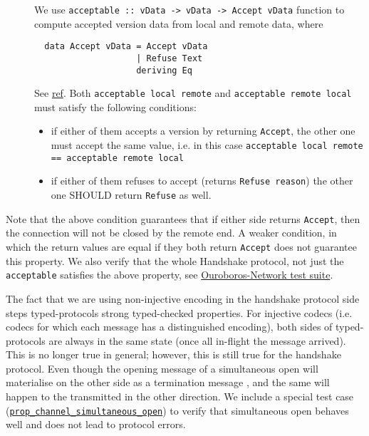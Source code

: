 \begin{description}
  \item[]
    We use \texttt{acceptable :: vData -> vData -> Accept vData}
    function to compute accepted version data from local and remote data,
    where
\begin{verbatim}
  data Accept vData = Accept vData
                    | Refuse Text
                    deriving Eq
\end{verbatim}
    See
    \href{https://ouroboros-network.cardano.intersectmbo.org/ouroboros-network-framework/Ouroboros-Network-Protocol-Handshake-Version.html#t:Acceptable}{ref}.
    Both \texttt{acceptable local remote} and \texttt{acceptable remote local}
    must satisfy the following conditions:
    \begin{itemize}
      \item if either of them accepts a version by returning \texttt{Accept},
        the other one must accept the same value, i.e. in this case
        \texttt{acceptable local remote == acceptable remote local}
      \item if either of them refuses to accept (returns \texttt{Refuse reason})
        the other one SHOULD return \texttt{Refuse} as well.
    \end{itemize}
\end{description}
Note that the above condition guarantees that if either side returns
\texttt{Accept}, then the connection will not be closed by the remote end.
A weaker condition, in which the return values are equal if they both return
\texttt{Accept} does not guarantee this property.  We also verify that the
whole Handshake protocol, not just the \texttt{acceptable} satisfies the above
property, see
\href{https://github.com/intersectmbo/ouroboros-network/blob/master/ouroboros-network/protocol-tests/Ouroboros/Network/Protocol/Handshake/Test.hs}{Ouroboros-Network
test suite}.

The fact that we are using non-injective encoding in the handshake protocol
side steps typed-protocols strong typed-checked properties.  For injective
codecs (i.e. codecs for which each message has a distinguished encoding), both
sides of typed-protocols are always in the same state (once all in-flight
the message arrived).  This is no longer true in general; however, this is still
true for the handshake protocol.  Even though the opening message
\MsgProposeVersions{} of a simultaneous open will materialise on the
other side as a termination message \MsgReplyVersions{}, and the same will
happen to the \MsgProposeVersions{} transmitted in the other direction.
We include a special test case
(\href{https://github.com/intersectmbo/ouroboros-network/blob/master/ouroboros-network/protocol-tests/Ouroboros/Network/Protocol/Handshake/Test.hs\#L551}{\texttt{prop\_channel\_simultaneous\_open}})
to verify that simultaneous open behaves well and does not lead to protocol
errors.

